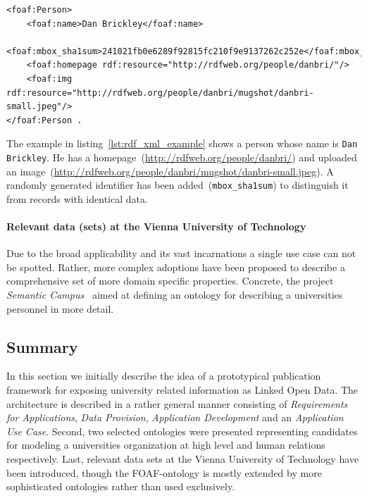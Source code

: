 \documentclass{article}
\begin{document}
\begin{lstlisting}[caption={RDF/XML representation of a person using the FOAF vocabulary},label={lst:rdf_xml_example}]
<foaf:Person>
	<foaf:name>Dan Brickley</foaf:name>
	<foaf:mbox_sha1sum>241021fb0e6289f92815fc210f9e9137262c252e</foaf:mbox_sha1sum>
	<foaf:homepage rdf:resource="http://rdfweb.org/people/danbri/"/>
	<foaf:img rdf:resource="http://rdfweb.org/people/danbri/mugshot/danbri-small.jpeg"/>
</foaf:Person .
\end{lstlisting}

The example in listing~\ref{lst:rdf_xml_example} shows a person whose name is \texttt{Dan Brickley}. He has a homepage~(\url{http://rdfweb.org/people/danbri/}) and uploaded an image~(\url{http://rdfweb.org/people/danbri/mugshot/danbri-small.jpeg}). A randomly generated identifier has been added~(\texttt{mbox\_sha1sum}) to distinguish it from records with identical data. 

\paragraph{Relevant data (sets) at the Vienna University of Technology}
Due to the broad applicability and its vast incarnations a single use case can not be spotted. Rather, more complex adoptions have been proposed to describe a comprehensive set of more domain specific properties. Concrete, the project \textit{Semantic Campus}~\cite{inproceedings:semantic-campus} aimed at defining an ontology for describing a universities personnel in more detail. 
\subsection{Summary}
In this section we initially describe the idea of a prototypical publication framework for exposing university related information as Linked Open Data. The architecture is described in a rather general manner consisting of \textit{Requirements for Applications}, \textit{Data Provision}, \textit{Application Development} and an \textit{Application Use Case}. Second, two selected ontologies were presented representing candidates for modeling a universities organization at high level and human relations respectively.
Last, relevant data sets at the Vienna University of Technology have been introduced, though the FOAF-ontology is mostly extended by more sophisticated ontologies rather than used exclusively. 
\end{document}
